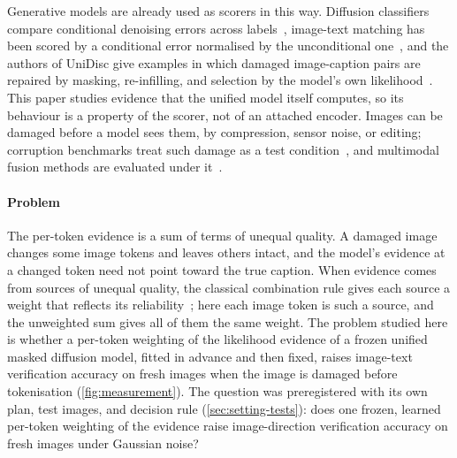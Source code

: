 Generative models are already used as scorers in this way.
Diffusion classifiers compare conditional denoising errors across labels~\cite{li2023diffusionclassifier,clark2023zeroshot}, image-text
matching has been scored by a conditional error normalised by the unconditional one~\cite{krojer2023diffusionitm}, and the authors of
UniDisc give examples in which damaged image-caption pairs are repaired by masking, re-infilling, and selection by the model's own
likelihood~\cite{swerdlow2025unidisc}.
This paper studies evidence that the unified model itself computes, so its behaviour is a property of the scorer, not of an attached
encoder.
Images can be damaged before a model sees them, by compression, sensor noise, or editing; corruption benchmarks treat such damage as a test
condition~\cite{hendrycks2019benchmarking}, and multimodal fusion methods are evaluated under it~\cite{zhang2024informative}.

\paragraph*{Problem}
The per-token evidence is a sum of terms of unequal quality.
A damaged image changes some image tokens and leaves others intact, and the model's evidence at a changed token need not point toward
the true caption.
When evidence comes from sources of unequal quality, the classical combination rule gives each source a weight that reflects its
reliability~\cite{chair1986optimal,kittler1998combining}; here each image token is such a source, and the unweighted sum gives all of them
the same weight.
The problem studied here is whether a per-token weighting of the likelihood evidence of a frozen unified masked diffusion model, fitted
in advance and then fixed, raises image-text verification accuracy on fresh images when the image is damaged before tokenisation
(\cref{fig:measurement}).
The question was preregistered with its own plan, test images, and decision rule (\cref{sec:setting-tests}): does one frozen, learned
per-token weighting of the evidence raise image-direction verification accuracy on fresh images under Gaussian noise?

